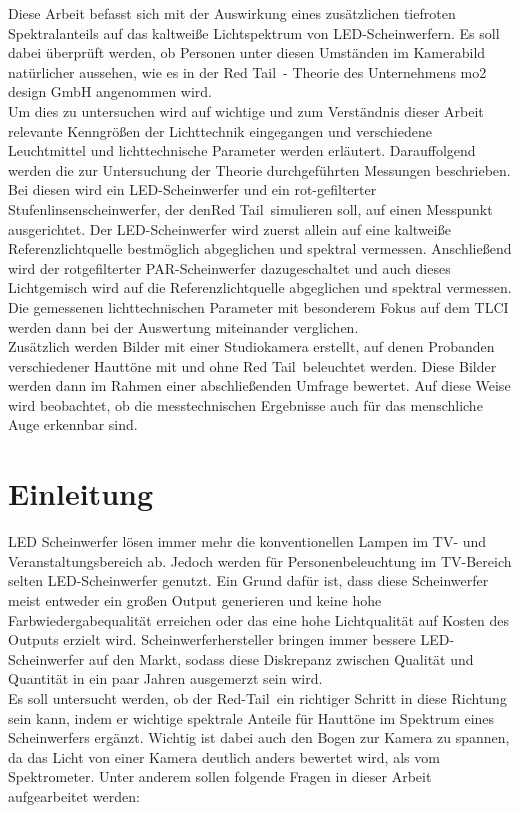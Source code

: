 Diese Arbeit befasst sich mit der Auswirkung eines zusätzlichen tiefroten Spektralanteils auf das kaltweiße Lichtspektrum von LED-Scheinwerfern. Es soll dabei überprüft werden, ob Personen unter diesen Umständen im Kamerabild natürlicher aussehen, wie es in der \glqq Red Tail\grqq\ - Theorie des Unternehmens mo2 design GmbH angenommen wird.\\
Um dies zu untersuchen wird auf wichtige und zum Verständnis dieser Arbeit relevante Kenngrößen der Lichttechnik eingegangen und verschiedene Leuchtmittel und lichttechnische Parameter werden erläutert. Darauffolgend werden die zur Untersuchung der Theorie durchgeführten Messungen beschrieben. Bei diesen wird ein LED-Scheinwerfer und ein rot-gefilterter Stufenlinsenscheinwerfer, der den\glqq Red Tail\grqq\ simulieren soll, auf einen Messpunkt ausgerichtet. Der LED-Scheinwerfer wird zuerst allein auf eine kaltweiße Referenzlichtquelle bestmöglich abgeglichen und spektral vermessen. Anschließend wird der rotgefilterter PAR-Scheinwerfer dazugeschaltet und auch dieses Lichtgemisch wird auf die Referenzlichtquelle abgeglichen und spektral vermessen. Die gemessenen lichttechnischen Parameter mit besonderem Fokus auf dem TLCI werden dann bei der Auswertung miteinander verglichen.\\
Zusätzlich werden Bilder mit einer Studiokamera erstellt, auf denen Probanden verschiedener Hauttöne mit und ohne \glqq Red Tail\grqq\ beleuchtet werden. Diese Bilder werden dann im Rahmen einer  abschließenden Umfrage bewertet. Auf diese Weise wird beobachtet, ob die messtechnischen Ergebnisse auch für das menschliche Auge erkennbar sind. 


\chapter{Einleitung}
LED Scheinwerfer lösen immer mehr die konventionellen Lampen im TV- und Veranstaltungsbereich ab. Jedoch werden für Personenbeleuchtung im TV-Bereich selten LED-Scheinwerfer genutzt. Ein Grund dafür ist, dass diese Scheinwerfer meist entweder ein großen Output generieren und keine hohe Farbwiedergabequalität erreichen oder das eine hohe Lichtqualität auf Kosten des Outputs erzielt wird. Scheinwerferhersteller bringen immer bessere LED-Scheinwerfer auf den Markt, sodass diese Diskrepanz zwischen Qualität und Quantität in ein paar Jahren ausgemerzt sein wird.\\
Es soll untersucht werden, ob der \glqq Red-Tail\grqq\ ein richtiger Schritt in diese Richtung sein kann, indem er wichtige spektrale Anteile für Hauttöne im Spektrum eines Scheinwerfers ergänzt. Wichtig ist dabei auch den Bogen zur Kamera zu spannen, da das Licht von einer Kamera deutlich anders bewertet wird, als vom Spektrometer. Unter anderem sollen folgende Fragen in dieser Arbeit aufgearbeitet werden:

